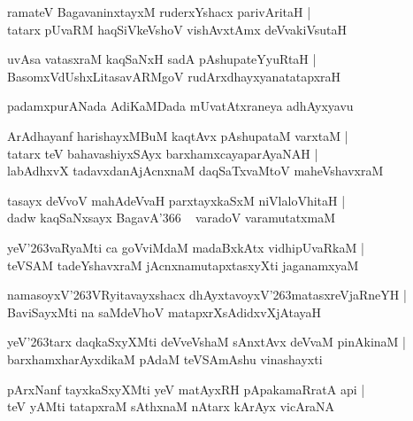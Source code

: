 \documentclass[twoside,12pt,openright]{book}
\def\S{\char'263}
\newcounter{shloka}[chapter]
\begin{document}
\begin{shloka}
ramateV BagavaninxtayxM ruderxYshacx parivAritaH |\\
tatarx pUvaRM haqSiVkeVshoV vishAvxtAmx deVvakiVsutaH 
\end{shloka}

\begin{shloka}
uvAsa vatasxraM kaqSaNxH sadA pAshupateYyuRtaH |\\
BasomxVdUshxLitasavARMgoV rudArxdhayxyanatatapxraH 
\end{shloka}

\begin{center}
padamxpurANada AdiKaMDada mUvatAtxraneya adhAyxyavu 
\end{center}

\begin{shloka}
ArAdhayanf harishayxMBuM kaqtAvx pAshupataM varxtaM |\\
tatarx teV bahavashiyxSAyx barxhamxcayaparAyaNAH |\\
labAdhxvX tadavxdanAjAcnxnaM daqSaTxvaMtoV maheVshavxraM 
\end{shloka}

\begin{shloka}
tasayx deVvoV mahAdeVvaH parxtayxkaSxM niVlaloVhitaH |\\
dadw kaqSaNxsayx BagavA\char'366 ~ varadoV varamutatxmaM 
\end{shloka}

\begin{shloka}
yeV\S vaRyaMti ca goVviMdaM madaBxkAtx  vidhipUvaRkaM |\\
teVSAM tadeYshavxraM jAcnxnamutapxtasxyXti jaganamxyaM  
\end{shloka}

\begin{shloka}
namasoyxV\S VRyitavayxshacx dhAyxtavoyxV\S matasxreVjaRneYH |\\
BaviSayxMti na saMdeVhoV matapxrXsAdidxvXjAtayaH 
\end{shloka}

\begin{shloka}
yeV\S tarx daqkaSxyXMti deVveVshaM  sAnxtAvx deVvaM pinAkinaM |\\
barxhamxharAyxdikaM pAdaM teVSAmAshu vinashayxti 
\end{shloka}

\begin{shloka}
pArxNanf tayxkaSxyXMti yeV matAyxRH pApakamaRratA api |\\
teV yAMti tatapxraM sAthxnaM nAtarx kArAyx vicAraNA 
\end{shloka}
\end{document}
